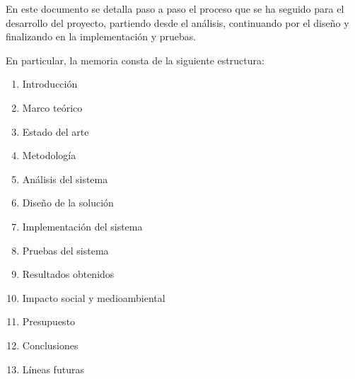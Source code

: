 En este documento se detalla paso a paso el proceso que se ha seguido para el desarrollo del proyecto, partiendo desde el análisis, continuando por el diseño y finalizando en la implementación y pruebas. 

En particular, la memoria consta de la siguiente estructura:
\begin{enumerate}
    \item Introducción
    \item Marco teórico
    \item Estado del arte
    \item Metodología 
    \item Análisis del sistema
    \item Diseño de la solución
    \item Implementación del sistema
    \item Pruebas del sistema
    \item Resultados obtenidos
    \item Impacto social y medioambiental
    \item Presupuesto
    \item Conclusiones
    \item Líneas futuras
\end{enumerate}